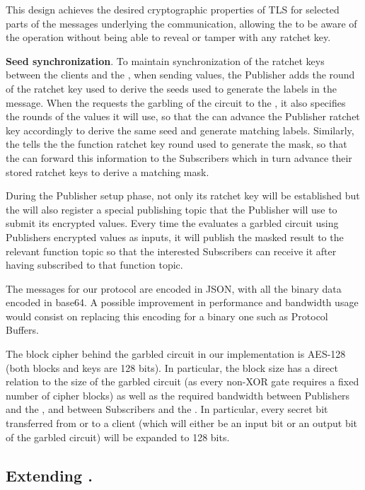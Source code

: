 This design achieves the desired cryptographic properties of TLS for selected
parts of the messages underlying the \MQTT{} communication, allowing the \broker
to be aware of the operation without being able to reveal or tamper with any
ratchet key.

\noindent\textbf{Seed synchronization}. To maintain synchronization of the
ratchet keys between the clients and the \garbler, when sending values, the
Publisher adds the round of the ratchet key used to derive the seeds used to
generate the labels in the message.  When the \broker requests the garbling of
the circuit to the \garbler, it also specifies the rounds of the values it will
use, so that the \garbler can advance the Publisher ratchet key accordingly to
derive the same seed and generate matching labels.  Similarly, the \garbler
tells the \broker the function ratchet key round used to generate the mask, so
that the \broker can forward this information to the Subscribers which in turn
advance their stored ratchet keys to derive a matching mask.

During the Publisher setup phase, not only its ratchet key will be established
but the \broker will also register a special publishing topic that the Publisher
will use to submit its encrypted values.  Every time the \broker evaluates a
garbled circuit using Publishers encrypted values as inputs, it will publish
the masked result to the relevant function topic so that the interested
Subscribers can receive it after having subscribed to that function topic.

The \MQTT{} messages for our protocol are encoded in JSON, with all the binary
data encoded in base64.  A possible improvement in performance and bandwidth
usage would consist on replacing this encoding for a binary one such as
Protocol Buffers.

The block cipher behind the garbled circuit in our implementation is AES-128
(both blocks and keys are 128 bits).  In particular, the block size has a
direct relation to the size of the garbled circuit (as every non-XOR gate
requires a fixed number of cipher blocks) as well as the required bandwidth
between Publishers and the \broker, and between Subscribers and the \broker.  In
particular, every secret bit transferred from or to a client (which will either
be an input bit or an output bit of the garbled circuit) will be expanded to
128 bits.

\vspace{-4pt}
\subsection{Extending \libgarble.}

